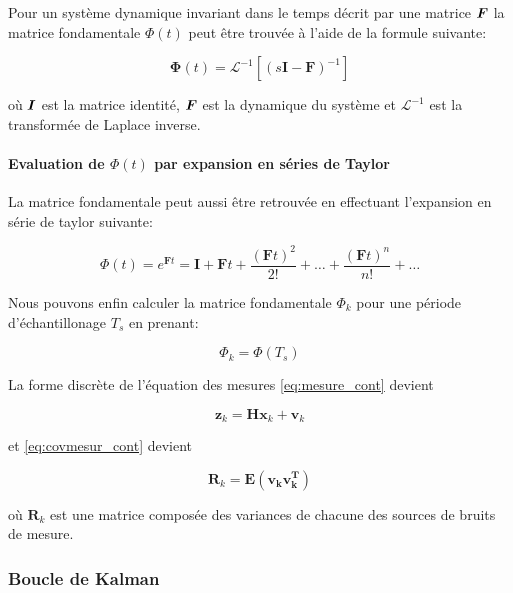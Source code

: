 \documentclass[12pt,a4paper]{report}
\begin{document}
	\para Pour un système dynamique invariant dans le temps décrit par une matrice $\boldsymbol{F}$ la matrice fondamentale $\Phi(t)$ peut être trouvée à l'aide de la formule suivante:
	
	\begin{equation}
	\boldsymbol \Phi(t) =  \mathcal{L}^{-1}[(s\boldsymbol{I-F})^{-1}]
	\end{equation}
	
	\para où $\boldsymbol{I}$ est la matrice identité, $\boldsymbol{F}$ est la dynamique du système et $\mathcal{L}^{-1}$ est la transformée de Laplace inverse.
	
	\paragraph*{Evaluation de $\Phi(t)$ par expansion en séries de Taylor}
	\para La matrice fondamentale peut aussi être retrouvée en effectuant l'expansion en série de taylor suivante:
	
	\begin{equation}
	 \Phi(t) = e^{\boldsymbol Ft} = \boldsymbol I + \boldsymbol Ft + \frac{(\boldsymbol Ft)^2}{2!} + \dots + \frac{(\boldsymbol Ft)^n}{n!} + \dots
	\end{equation}
	
	\para Nous pouvons enfin calculer la matrice fondamentale $\Phi_k$ pour une période d'échantillonage $T_s$ en prenant:
	
	\begin{equation}
	\Phi_k = \Phi(T_s)
	\end{equation}
	
	\para La forme discrète de l'équation des mesures \ref{eq:mesure_cont} devient
	
	\begin{equation}
	 \boldsymbol z_k = \boldsymbol H \boldsymbol x_k +\boldsymbol  v_k
	\end{equation}
	
	\para et \ref{eq:covmesur_cont} devient
	
	\begin{equation}
	  \boldsymbol R_k = \boldsymbol{E(v_k v_k^T)}
	\end{equation}

	\para où $\boldsymbol R_k$ est une matrice composée des variances de chacune des sources de bruits de mesure.
	
	\subsubsection{Boucle de Kalman}
	\label{sec:boucledekalman}
	
\end{document}
